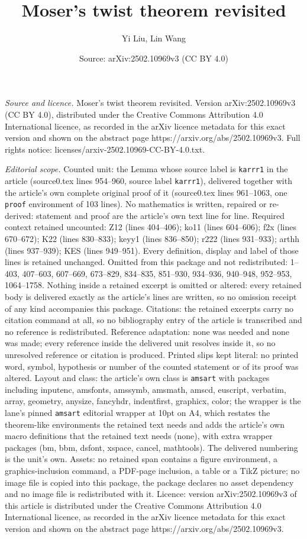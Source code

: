 \documentclass[10pt,a4paper]{amsart}
\title[Moser's twist theorem revisited]{Moser's twist theorem revisited}
\author{Yi Liu, Lin Wang}
\date{Source: arXiv:2502.10969v3 (CC BY 4.0)}
\begin{document}
\maketitle

\noindent\emph{Source and licence.} Moser's twist theorem revisited. Version arXiv:2502.10969v3 (CC BY 4.0), distributed under the Creative Commons Attribution 4.0 International licence, as recorded in the arXiv licence metadata for this exact version and shown on the abstract page https://arxiv.org/abs/2502.10969v3. Full rights notice: licenses/arxiv-2502.10969-CC-BY-4.0.txt.\par\smallskip

\noindent\textit{Editorial scope.} Counted unit: the Lemma whose source label is \texttt{karrr1} in the article (source0.tex lines 954--960, source label \texttt{karrr1}), delivered together with the article's own complete original proof of it (source0.tex lines 961--1063, one \texttt{proof} environment of 103 lines). No mathematics is written, repaired or re-derived: statement and proof are the article's own text line for line. Required context retained uncounted: Z12 (lines 404--406); ko11 (lines 604--606); f2x (lines 670--672); K22 (lines 830--833); keyy1 (lines 836--850); r222 (lines 931--933); arthh (lines 937--939); KES (lines 949--951). Every definition, display and label of those lines is retained unchanged. Omitted from this package and not redistributed: 1--403, 407--603, 607--669, 673--829, 834--835, 851--930, 934--936, 940--948, 952--953, 1064--1758. Nothing inside a retained excerpt is omitted or altered: every retained body is delivered exactly as the article's lines are written, so no omission receipt of any kind accompanies this package. Citations: the retained excerpts carry no citation command at all, so no bibliography entry of the article is transcribed and no reference is redistributed. Reference adaptation: none was needed and none was made; every reference inside the delivered unit resolves inside it, so no unresolved reference or citation is produced. Printed slips kept literal: no printed word, symbol, hypothesis or number of the counted statement or of its proof was altered. Layout and class: the article's own class is \texttt{amsart} with packages including inputenc, amsfonts, amssymb, amsmath, amscd, euscript, verbatim, array, geometry, anysize, fancyhdr, indentfirst, graphicx, color; the wrapper is the lane's pinned \texttt{amsart} editorial wrapper at 10pt on A4, which restates the theorem-like environments the retained text needs and adds the article's own macro definitions that the retained text needs (none), with extra wrapper packages (bm, bbm, dsfont, xspace, cancel, mathtools). The delivered numbering is the unit's own. Assets: no retained span contains a figure environment, a graphics-inclusion command, a PDF-page inclusion, a table or a TikZ picture; no image file is copied into this package, the package declares no asset dependency and no image file is redistributed with it. Licence: version arXiv:2502.10969v3 of this article is distributed under the Creative Commons Attribution 4.0 International licence, as recorded in the arXiv licence metadata for this exact version and shown on the abstract page https://arxiv.org/abs/2502.10969v3. 
\end{document}
